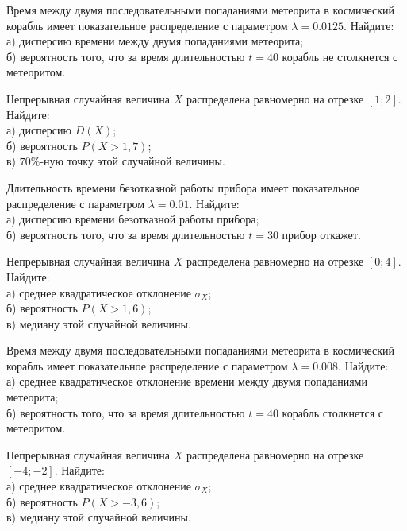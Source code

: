 \vfill

\z Время между двумя последовательными попаданиями метеорита в космический корабль имеет показательное распределение с параметром $\lambda = 0.0125$. Найдите: \\ \quad а) дисперсию времени между двумя попаданиями метеорита; \\ \quad б) вероятность того, что за время длительностью $t = 40$ корабль не столкнется с метеоритом.
 

\vfill

\newpage\setcounter{zad}{0}

\z Непрерывная случайная величина $X$ распределена равномерно на отрезке $[1; 2]$. Найдите: \\ \quad а) дисперсию $D(X)$; \\ \quad б) вероятность $P(X>1{,}7)$; \\ \quad в) $70\%$-ную точку этой случайной величины.


\vfill

\z Длительность времени безотказной работы прибора имеет показательное распределение с параметром $\lambda = 0.01$. Найдите: \\ \quad а) дисперсию времени безотказной работы прибора; \\ \quad б) вероятность того, что за время длительностью $t = 30$ прибор  откажет.
 

\vfill

\newpage\setcounter{zad}{0}

\z Непрерывная случайная величина $X$ распределена равномерно на отрезке $[0; 4]$. Найдите: \\ \quad а) среднее квадратическое отклонение $\sigma_X$; \\ \quad б) вероятность $P(X>1{,}6)$; \\ \quad в) медиану этой случайной величины.


\vfill

\z Время между двумя последовательными попаданиями метеорита в космический корабль имеет показательное распределение с параметром $\lambda = 0.008$. Найдите: \\ \quad а) среднее квадратическое отклонение времени между двумя попаданиями метеорита; \\ \quad б) вероятность того, что за время длительностью $t = 40$ корабль  столкнется с метеоритом.
 

\vfill

\newpage\setcounter{zad}{0}

\z Непрерывная случайная величина $X$ распределена равномерно на отрезке $[-4; -2]$. Найдите: \\ \quad а) среднее квадратическое отклонение $\sigma_X$; \\ \quad б) вероятность $P(X>-3{,}6)$; \\ \quad в) медиану этой случайной величины.


